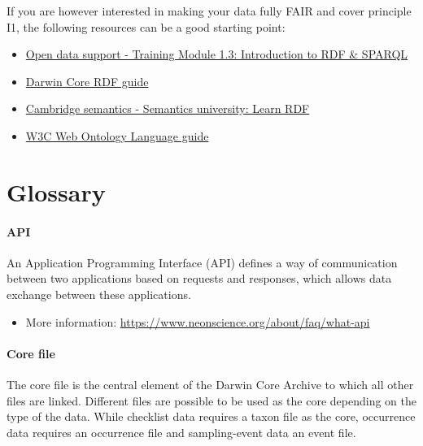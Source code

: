 \documentclass[
  oneside]{book}
\providecommand{\tightlist}{%
  \setlength{\itemsep}{0pt}\setlength{\parskip}{0pt}}
\begin{document}
If you are however interested in making your data fully FAIR and cover principle I1, the following resources can be a good starting point:

\begin{itemize}
\item
  \href{https://data.europa.eu/sites/default/files/d2.1.2_training_module_1.3_introduction_to_rdf_sparql_en_edp.pdf}{Open data support - Training Module 1.3: Introduction to RDF \& SPARQL}
\item
  \href{https://dwc.tdwg.org/rdf/}{Darwin Core RDF guide}
\item
  \href{https://cambridgesemantics.com/blog/semantic-university/learn-rdf/}{Cambridge semantics - Semantics university: Learn RDF}
\item
  \href{https://www.w3.org/TR/owl-guide/}{W3C Web Ontology Language guide}
\end{itemize}

\chapter{Glossary}\label{glossary}

\subsubsection*{API}\label{API}

An Application Programming Interface (API) defines a way of communication between two applications based on requests and responses, which allows data exchange between these applications.

\begin{itemize}
\tightlist
\item
  More information: \url{https://www.neonscience.org/about/faq/what-api}
\end{itemize}

\subsubsection*{Core file}\label{core}

The core file is the central element of the Darwin Core Archive to which all other files are linked. Different files are possible to be used as the core depending on the type of the data. While checklist data requires a taxon file as the core, occurrence data requires an occurrence file and sampling-event data an event file.
\end{document}
